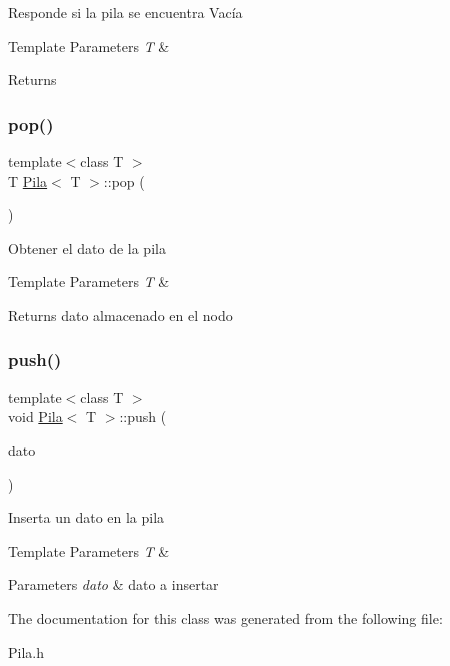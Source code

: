 Responde si la pila se encuentra Vacía 
\begin{DoxyTemplParams}{Template Parameters}
{\em T} & \\
\hline
\end{DoxyTemplParams}
\begin{DoxyReturn}{Returns}

\end{DoxyReturn}
\mbox{\label{class_pila_a9250ad4ed594b141d6cdeacc6684ff9a}} 
\subsubsection{\texorpdfstring{pop()}{pop()}}
{\footnotesize\ttfamily template$<$class T $>$ \\
T \mbox{\hyperlink{class_pila}{Pila}}$<$ T $>$\+::pop (\begin{DoxyParamCaption}{ }\end{DoxyParamCaption})}

Obtener el dato de la pila 
\begin{DoxyTemplParams}{Template Parameters}
{\em T} & \\
\hline
\end{DoxyTemplParams}
\begin{DoxyReturn}{Returns}
dato almacenado en el nodo 
\end{DoxyReturn}
\mbox{\label{class_pila_a6de443a0634a3f5d3c1c52e640b408c9}} 
\subsubsection{\texorpdfstring{push()}{push()}}
{\footnotesize\ttfamily template$<$class T $>$ \\
void \mbox{\hyperlink{class_pila}{Pila}}$<$ T $>$\+::push (\begin{DoxyParamCaption}\item[{T}]{dato }\end{DoxyParamCaption})}

Inserta un dato en la pila 
\begin{DoxyTemplParams}{Template Parameters}
{\em T} & \\
\hline
\end{DoxyTemplParams}

\begin{DoxyParams}{Parameters}
{\em dato} & dato a insertar \\
\hline
\end{DoxyParams}


The documentation for this class was generated from the following file\+:\begin{DoxyCompactItemize}
\item 
Pila.\+h\end{DoxyCompactItemize}
